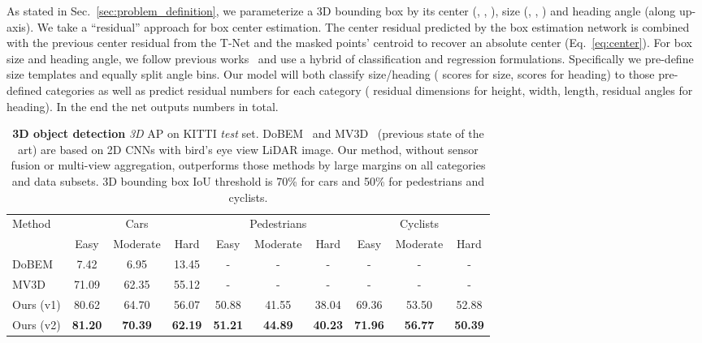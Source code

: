 \documentclass[10pt,twocolumn,letterpaper]{article}
\begin{document}
As stated in Sec.~\ref{sec:problem_definition}, we parameterize a 3D bounding box by its center (, , ), size (, , ) and heading angle  (along up-axis). We take a ``residual'' approach for box center estimation. The center residual predicted by the box estimation network is combined with the previous center residual from the T-Net and the masked points' centroid to recover an absolute center (Eq.~\ref{eq:center}). For box size and heading angle, we follow previous works~\cite{ren2015faster, mousavian20163d} and use a hybrid of classification and regression formulations. Specifically we pre-define  size templates and  equally split angle bins. Our model will both classify size/heading ( scores for size,  scores for heading) to those pre-defined categories as well as predict residual numbers for each category ( residual dimensions for height, width, length,  residual angles for heading). In the end the net outputs  numbers in total.








\begin{table*}[t!]
\small
\centering
\begin{tabular}{l||ccc||ccc||ccc}
\hline
\multirow{2}{*}{Method} & \multicolumn{3}{c||}{Cars} & \multicolumn{3}{c||}{Pedestrians} & \multicolumn{3}{c}{Cyclists} \\ \cline{2-10} 
                        & Easy  & Moderate  & Hard  & Easy     & Moderate    & Hard    & Easy    & Moderate   & Hard   \\ \hline
DoBEM~\cite{yuvehicle} & 7.42 & 6.95 & 13.45 & - & - & - & - & - & - \\
MV3D~\cite{cvpr17chen} & 71.09 & 62.35 & 55.12 & - & - & - & - & - & - \\ \hline
Ours (v1) & 80.62 & 64.70 & 56.07 & 50.88 & 41.55 & 38.04 & 69.36 & 53.50 & 52.88 \\
Ours (v2) & \textbf{81.20} & \textbf{70.39} & \textbf{62.19} & \textbf{51.21} & \textbf{44.89} & \textbf{40.23} & \textbf{71.96} & \textbf{56.77} & \textbf{50.39} \\ \hline
\end{tabular}
\caption{\textbf{3D object detection} \emph{3D} AP on KITTI \emph{test} set. DoBEM~\cite{yuvehicle} and MV3D~\cite{cvpr17chen} (previous state of the art) are based on 2D CNNs with bird's eye view LiDAR image.
Our method, without sensor fusion or multi-view aggregation, outperforms those methods by large margins on all categories and data subsets. 3D bounding box IoU threshold is 70\% for cars and 50\% for pedestrians and cyclists.}
\label{tab:kitti_test_3d_detection}
\end{table*}
\end{document}
